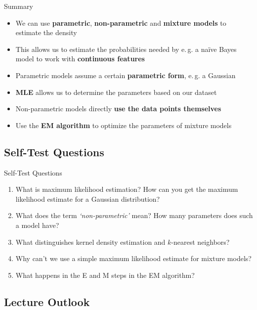 \begin{frame}{Summary}{}
	\begin{itemize}
		\item We can use \textbf{parametric}, \textbf{non-parametric} and \textbf{mixture models} to estimate the density
		\item This allows us to estimate the probabilities needed by e.\,g. a na\"ive Bayes model to work with \textbf{continuous features}
		\item Parametric models assume a certain \textbf{parametric form}, e.\,g. a Gaussian
		\item \textbf{MLE} allows us to determine the parameters based on our dataset
		\item Non-parametric models directly \textbf{use the data points themselves}
		\item Use the \textbf{EM algorithm} to optimize the parameters of mixture models
	\end{itemize}
\end{frame}


\subsection{Self-Test Questions}

\begin{frame}{Self-Test Questions}{}\important
	\begin{enumerate}
		\item What is maximum likelihood estimation? How can you get the maximum likelihood estimate for a Gaussian distribution?
		\item What does the term \textit{`non-parametric'} mean? How many parameters does such a model have?
		\item What distinguishes kernel density estimation and $k$-nearest neighbors?
		\item Why can't we use a simple maximum likelihood estimate for mixture models?
		\item What happens in the E and M steps in the EM algorithm?
	\end{enumerate}
\end{frame}


\subsection{Lecture Outlook}

